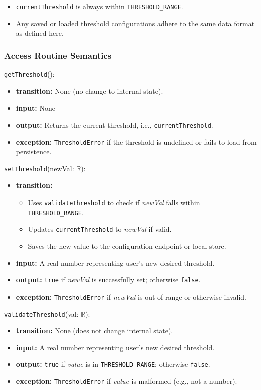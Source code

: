 \documentclass[12pt, titlepage]{article}
\begin{document}
\begin{itemize}
    \item \texttt{currentThreshold} is always within \texttt{THRESHOLD\_RANGE}.
    \item Any saved or loaded threshold configurations adhere to the same data format as defined here.
\end{itemize}

\subsubsection{Access Routine Semantics}

\noindent \texttt{getThreshold}():
\begin{itemize}
    \item \textbf{transition:} None (no change to internal state).
    \item \textbf{input:} None
    \item \textbf{output:} Returns the current threshold, i.e., \texttt{currentThreshold}.
    \item \textbf{exception:} \texttt{ThresholdError} if the threshold is undefined or fails to load from persistence.
\end{itemize}

\noindent \texttt{setThreshold}(newVal: $\mathbb{R}$):
\begin{itemize}
    \item \textbf{transition:}
    \begin{itemize}
        \item Uses \texttt{validateThreshold} to check if \textit{newVal} falls within \texttt{THRESHOLD\_RANGE}.
        \item Updates \texttt{currentThreshold} to \textit{newVal} if valid.
        \item Saves the new value to the configuration endpoint or local store.
    \end{itemize}
    \item \textbf{input:} A real number representing user's new desired threshold.
    \item \textbf{output:} \texttt{true} if \textit{newVal} is successfully set; otherwise \texttt{false}.
    \item \textbf{exception:} \texttt{ThresholdError} if \textit{newVal} is out of range or otherwise invalid.
\end{itemize}

\noindent \texttt{validateThreshold}(val: $\mathbb{R}$):
\begin{itemize}
    \item \textbf{transition:} None (does not change internal state).
    \item \textbf{input:} A real number representing user's new desired threshold.
    \item \textbf{output:} \texttt{true} if \textit{value} is in \texttt{THRESHOLD\_RANGE}; otherwise \texttt{false}.
    \item \textbf{exception:} \texttt{ThresholdError} if \textit{value} is malformed (e.g., not a number).
\end{itemize}
\end{document}
